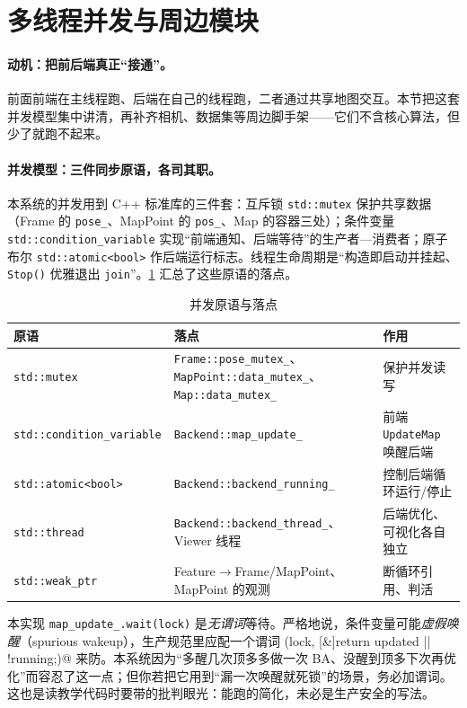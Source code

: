 \section{多线程并发与周边模块}
\label{sec:sys-thread}

\paragraph{动机：把前后端真正“接通”。}
前面前端在主线程跑、后端在自己的线程跑，二者通过共享地图交互。本节把这套并发模型集中讲清，再补齐相机、数据集等周边脚手架——它们不含核心算法，但少了就跑不起来。

\paragraph{并发模型：三件同步原语，各司其职。}
本系统的并发用到 C++ 标准库的三件套：互斥锁 \texttt{std::mutex} 保护共享数据（Frame 的 \texttt{pose\_}、MapPoint 的 \texttt{pos\_}、Map 的容器三处）；条件变量 \texttt{std::condition\_variable} 实现“前端通知、后端等待”的生产者—消费者；原子布尔 \texttt{std::atomic<bool>} 作后端运行标志。线程生命周期是“构造即启动并挂起、\texttt{Stop()} 优雅退出 \texttt{join}”。\cref{tab:sys-concurrency} 汇总了这些原语的落点。

\begin{table}[H]\centering\small
\caption{并发原语与落点}
\label{tab:sys-concurrency}
\begin{tabular}{lll}
\toprule
原语 & 落点 & 作用 \\
\midrule
\texttt{std::mutex} & \texttt{Frame::pose\_mutex\_}、\texttt{MapPoint::data\_mutex\_}、\texttt{Map::data\_mutex\_} & 保护并发读写 \\
\texttt{std::condition\_variable} & \texttt{Backend::map\_update\_} & 前端 \texttt{UpdateMap} 唤醒后端 \\
\texttt{std::atomic<bool>} & \texttt{Backend::backend\_running\_} & 控制后端循环运行/停止 \\
\texttt{std::thread} & \texttt{Backend::backend\_thread\_}、Viewer 线程 & 后端优化、可视化各自独立 \\
\texttt{std::weak\_ptr} & Feature$\to$Frame/MapPoint、MapPoint 的观测 & 断循环引用、判活 \\
\bottomrule
\end{tabular}
\end{table}

\begin{pitfall}
本实现 \verb|map_update_.wait(lock)| 是\emph{无谓词}等待。严格地说，条件变量可能\emph{虚假唤醒}（spurious wakeup），生产规范里应配一个谓词 \verb@wait(lock, [&]{return updated || !running;})@ 来防。本系统因为“多醒几次顶多多做一次 BA、没醒到顶多下次再优化”而容忍了这一点；但你若把它用到“漏一次唤醒就死锁”的场景，务必加谓词。这也是读教学代码时要带的批判眼光：能跑的简化，未必是生产安全的写法。
\end{pitfall}

